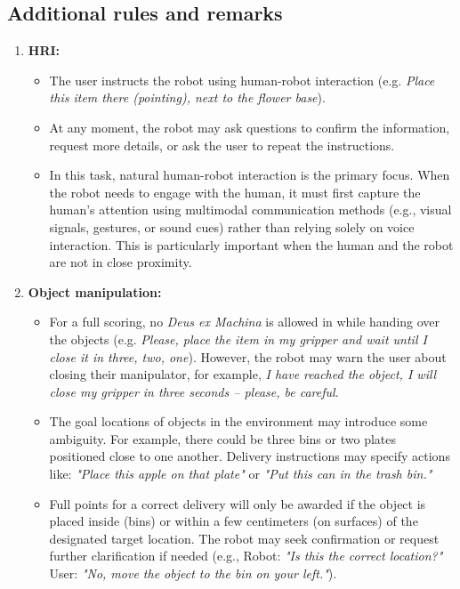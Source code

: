 \subsection*{Additional rules and remarks}
\begin{enumerate}[nosep]
	\item \textbf{HRI:}
	\begin{itemize}[nosep]
            \item  The user instructs the robot using human-robot interaction (e.g. \textit{Place this item there (pointing), next to the flower base}).
		\item At any moment, the robot may ask questions to confirm the information, request more details, or ask the user to repeat the instructions.
		\item In this task, natural human-robot interaction is the primary focus. When the robot needs to engage with the human, it must first capture the human’s attention using multimodal communication methods (e.g., visual signals, gestures, or sound cues) rather than relying solely on voice interaction. This is particularly important when the human and the robot are not in close proximity.
	\end{itemize}
	\item \textbf{Object manipulation:} 
        \begin{itemize}[nosep]
            \item For a full scoring, no \textit{Deus ex Machina} is allowed in while handing over the objects (e.g. \textit{Please, place the item in my gripper and wait until I close it in three, two, one}). However, the robot may warn the user about closing their manipulator, for example, \textit{I have reached the object, I will close my gripper in three seconds -- please, be careful}.
            \item The goal locations of objects in the environment may introduce some ambiguity. For example, there could be three bins or two plates positioned close to one another. Delivery instructions may specify actions like: \textit{"Place this apple on that plate"} or \textit{"Put this can in the trash bin."}
            \item Full points for a correct delivery will only be awarded if the object is placed inside (bins) or within a few centimeters (on surfaces) of the designated target location. The robot may seek confirmation or request further clarification if needed (e.g., Robot: \textit{"Is this the correct location?"} User: \textit{"No, move the object to the bin on your left."}).

\end{itemize}
\end{enumerate}
